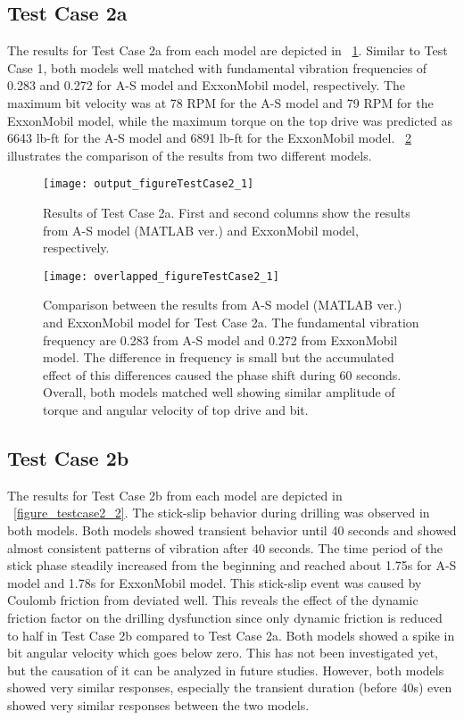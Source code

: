 \subsection{Test Case 2a}
The results for Test Case 2a from each model are depicted in \figurename~\ref{figure_testcase2_1}. Similar to Test Case 1, both models well matched with fundamental vibration frequencies of 0.283 and 0.272 for A-S model and ExxonMobil model, respectively. The maximum bit velocity was at 78 RPM for the A-S model and 79 RPM for the ExxonMobil model, while the maximum torque on the top drive was predicted as 6643 lb-ft for the A-S model and 6891 lb-ft for the ExxonMobil model. \figurename~\ref{figure_testcase2_1_overlapped} illustrates the comparison of the results from two different models. 
\begin{figure}
  \centering
  \texttt{[image: output\_figureTestCase2\_1]}
  \caption[Results of Test Case 2a]{Results of Test Case 2a. First and second columns show the results from A-S model (MATLAB ver.) and ExxonMobil model, respectively.}\label{figure_testcase2_1}
\end{figure}

\begin{figure}
  \centering
  \texttt{[image: overlapped\_figureTestCase2\_1]}
  \caption[Comparison of the results for Test Case 2a]{Comparison between the results from A-S model (MATLAB ver.) and ExxonMobil model for Test Case 2a. The fundamental vibration frequency are 0.283 from A-S model and 0.272 from ExxonMobil model. The difference in frequency is small but the accumulated effect of this differences caused the phase shift during 60 seconds. Overall, both models matched well showing similar amplitude of torque and angular velocity of top drive and bit.}\label{figure_testcase2_1_overlapped}
\end{figure}


\subsection{Test Case 2b}
The results for Test Case 2b from each model are depicted in \figurename~\ref{figure_testcase2_2}. The stick-slip behavior during drilling was observed in both models. Both models showed transient behavior until 40 seconds and showed almost consistent patterns of vibration after 40 seconds. The time period of the stick phase steadily increased from the beginning and reached about 1.75s for A-S model and 1.78s for ExxonMobil model. This stick-slip event was caused by Coulomb friction from deviated well. This reveals the effect of the dynamic friction factor on the drilling dysfunction since only dynamic friction is reduced to half in Test Case 2b compared to Test Case 2a. Both models showed a spike in bit angular velocity which goes below zero. This has not been investigated yet, but the causation of it can be analyzed in future studies. However, both models showed very similar responses, especially the transient duration (before 40s) even showed very similar responses between the two models.

